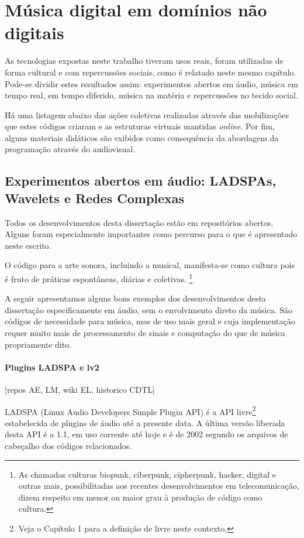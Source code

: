 \chapter{Música digital em domínios não digitais}
\label{cap:musicaExtra}

As tecnologias expostas neste trabalho tiveram
usos reais, foram utilizadas de
forma cultural e com repercussões sociais, como é relatado neste mesmo
capítulo.
Pode-se dividir estes resultados assim: experimentos abertos em áudio, música em tempo real, em tempo diferido, música na matéria e repercussões no tecido social.

Há uma listagem abaixo das ações coletivas realizadas através
das mobilizações que estes códigos criaram e as estruturas virtuais
mantidas \emph{online}.
 Por fim, alguns materiais didáticos são exibidos como consequência da abordagem da programação através do audiovisual.

\section{Experimentos abertos em áudio: LADSPAs, Wavelets e Redes Complexas}

Todos os desenvolvimentos desta dissertação estão em repositórios
abertos.\cite{repoDissertacao} Alguns foram especialmente
importantes como percurso para o que é apresentado neste escrito.

O código para a arte sonora, incluindo a musical, manifesta-se como cultura pois é fruto de práticas
espontâneas, diárias e coletivas.
\footnote{As chamadas culturas biopunk, ciberpunk, cipherpunk, hacker,
  digital e outras mais, possibilitadas aos recentes desenvolvimentos
  em telecomunicação, dizem respeito em menor ou maior grau à produção
  de código como cultura.}

A seguir apresentamos alguns bons exemplos dos desenvolvimentos desta
dissertação especificamente em áudio, sem o envolvimento direto da
música. São códigos de necessidade para música, mas de uso mais geral
e cuja implementação requer muito mais de processamento de sinais e
computação do que de música propriamente dito.

\subsubsection{Plugins LADSPA e lv2}
      [repos AE, LM, wiki EL, historico CDTL] 

LADSPA (Linux Audio Developers Simple Plugin API) é a API
livre\footnote{Veja o Capítulo 1 para a definição de livre neste
  contexto.}  estabelecida de plugins de áudio até a presente data. A
última versão liberada desta API é a 1.1, em uso corrente até hoje e é
de 2002 segundo os arquivos de cabeçalho dos códigos relacionados.

